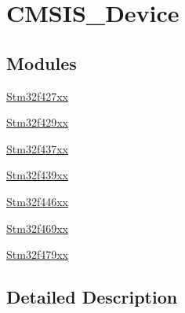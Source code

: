 \hypertarget{group___c_m_s_i_s___device}{}\section{C\+M\+S\+I\+S\+\_\+\+Device}
\label{group___c_m_s_i_s___device}
\subsection*{Modules}
\begin{DoxyCompactItemize}
\item 
\hyperlink{group__stm32f427xx}{Stm32f427xx}
\item 
\hyperlink{group__stm32f429xx}{Stm32f429xx}
\item 
\hyperlink{group__stm32f437xx}{Stm32f437xx}
\item 
\hyperlink{group__stm32f439xx}{Stm32f439xx}
\item 
\hyperlink{group__stm32f446xx}{Stm32f446xx}
\item 
\hyperlink{group__stm32f469xx}{Stm32f469xx}
\item 
\hyperlink{group__stm32f479xx}{Stm32f479xx}
\end{DoxyCompactItemize}


\subsection{Detailed Description}
